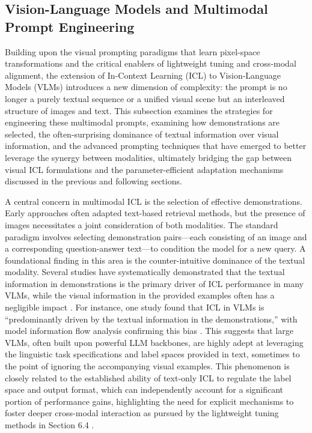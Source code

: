 \documentclass[11pt]{article}
\begin{document}
\subsection{Vision-Language Models and Multimodal Prompt Engineering}

Building upon the visual prompting paradigms that learn pixel-space transformations and the critical enablers of lightweight tuning and cross-modal alignment, the extension of In-Context Learning (ICL) to Vision-Language Models (VLMs) introduces a new dimension of complexity: the prompt is no longer a purely textual sequence or a unified visual scene but an interleaved structure of images and text. This subsection examines the strategies for engineering these multimodal prompts, examining how demonstrations are selected, the often-surprising dominance of textual information over visual information, and the advanced prompting techniques that have emerged to better leverage the synergy between modalities, ultimately bridging the gap between visual ICL formulations and the parameter-efficient adaptation mechanisms discussed in the previous and following sections.

A central concern in multimodal ICL is the selection of effective demonstrations. Early approaches often adapted text-based retrieval methods, but the presence of images necessitates a joint consideration of both modalities. The standard paradigm involves selecting demonstration pairs---each consisting of an image and a corresponding question-answer text---to condition the model for a new query. A foundational finding in this area is the counter-intuitive dominance of the textual modality. Several studies have systematically demonstrated that the textual information in demonstrations is the primary driver of ICL performance in many VLMs, while the visual information in the provided examples often has a negligible impact \cite{ref221,ref220}. For instance, one study found that ICL in VLMs is ``predominantly driven by the textual information in the demonstrations,'' with model information flow analysis confirming this bias \cite{ref221}. This suggests that large VLMs, often built upon powerful LLM backbones, are highly adept at leveraging the linguistic task specifications and label spaces provided in text, sometimes to the point of ignoring the accompanying visual examples. This phenomenon is closely related to the established ability of text-only ICL to regulate the label space and output format, which can independently account for a significant portion of performance gains, highlighting the need for explicit mechanisms to foster deeper cross-modal interaction as pursued by the lightweight tuning methods in Section 6.4 \cite{ref7}.
\end{document}
